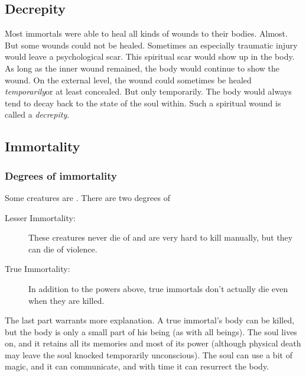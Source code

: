 \subsection{Decrepity}
Most immortals were able to heal all kinds of wounds to their bodies. 
Almost. 
But some wounds could not be healed. 
Sometimes an especially traumatic injury would leave a psychological scar. 
This spiritual scar would show up in the body.
As long as the inner wound remained, the body would continue to show the wound. 
On the external level, the wound could sometimes be healed \emph{temporarily}\dash or at least concealed.
But only temporarily.
The body would always tend to decay back to the state of the soul within. 
Such a spiritual wound is called a \emph{decrepity}. 









\subsection{Immortality}





\subsubsection{Degrees of immortality}
Some creatures are . 
There are two degrees of 

\begin{description}
  \item[Lesser Immortality:] 
    These creatures never die of  and are very hard to kill manually, but they can die of violence. 
  \item[True Immortality:]
    In addition to the powers above, true immortals don't actually die even when they are killed. 
\end{description}

The last part warrants more explanation. 
A true immortal's body can be killed, but the body is only a small part of his being (as with all beings). 
The soul lives on, and it retains all its memories and most of its power (although physical death may leave the soul knocked temporarily unconscious). 
The soul can use a bit of magic, and it can communicate, and with time it can resurrect the body. 

